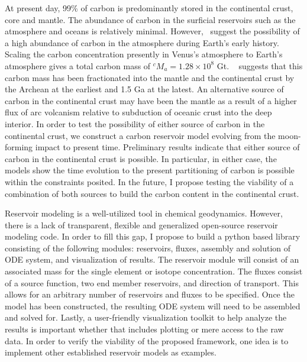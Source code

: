 At present day, 99\% of carbon is predominantly stored in the continental crust, core and mantle. The abundance of carbon in the surficial reservoirs such as the atmosphere and oceans is relatively minimal. However,~\citet{KJF-ATP:1986} suggest the possibility of a high abundance of carbon in the atmosphere during Earth's early history. Scaling the carbon concentration presently in Venus's atmosphere to Earth's atmosphere gives a total carbon mass of $^cM_{a} = 1.28 \times 10^8$ Gt. ~\citet{KJD:2002} suggests that this carbon mass has been fractionated into the mantle and the continental crust by the Archean at the earliest and 1.5 Ga at the latest. An alternative source of carbon in the continental crust may have been the mantle as a result of a higher flux of arc volcanism relative to subduction of oceanic crust into the deep interior. In order to test the possibility of either source of carbon in the continental crust, we construct a carbon reservoir model evolving from the moon-forming impact to present time. Preliminary results indicate that either source of carbon in the continental crust is possible. In particular, in either case, the models show the time evolution to the present partitioning of carbon is possible within the constraints posited. In the future, I propose testing the viability of a combination of both sources to build the carbon content in the continental crust.

Reservoir modeling is a well-utilized tool in chemical geodynamics. However, there is a lack of transparent, flexible and generalized open-source reservoir modeling code. In order to fill this gap, I propose to build a python based library consisting of the following modules: reservoirs, fluxes, assembly and solution of ODE system, and visualization of results. The reservoir module will consist of an associated mass for the single element or isotope concentration. The fluxes consist of a source function, two end member reservoirs, and direction of transport. This allows for an arbitrary number of reservoirs and fluxes to be specified. Once the model has been constructed, the resulting ODE system will need to be assembled and solved for. Lastly, a user-friendly visualization toolkit to help analyze the results is important whether that includes plotting or mere access to the raw data. In order to verify the viability of the proposed framework, one idea is to implement other established reservoir models as examples.
